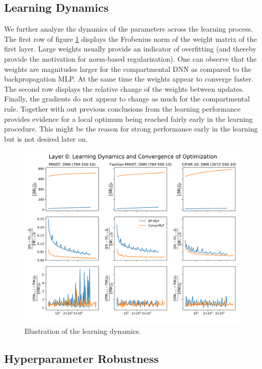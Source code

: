 \documentclass[colorinlistoftodos]{article}
\theoremstyle{definition}
\begin{document}
\subsection*{Learning Dynamics}

We further analyze the dynamics of the parameters across the learning process. The first row of figure \ref{fig:dynamics} displays the Frobenius norm of the weight matrix of the first layer. Large weights usually provide an indicator of overfitting (and thereby provide the motivation for norm-based regularization). One can observe that the weights are magnitudes larger for the compartmental DNN as compared to the backpropagation MLP. At the same time the weights appear to converge faster. The second row displays the relative change of the weights between updates. Finally, the gradients do not appear to change as much for the compartmental rule.
Together with out previous conclusions from the learning performance provides evidence for a local optimum being reached fairly early in the learning procedure. This might be the reason for strong performance early in the learning but is not desired later on.

\begin{figure}[H]
	\centering
	\includegraphics[width=\textwidth]{../figures/dynamics_l0}
	\caption{Illustration of the learning dynamics.}\label{fig:dynamics}
\end{figure}


\subsection*{Hyperparameter Robustness}
\end{document}
